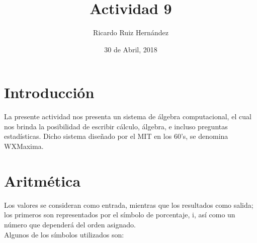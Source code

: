 \documentclass{article}
\title{Actividad 9}
\author{Ricardo Ruiz Hernández}
\date{30 de Abril, 2018}
\begin{document}
\maketitle 
\section*{Introducción}
La presente actividad nos presenta un sistema de álgebra computacional, el cual nos brinda la posibilidad de escribir cálculo, álgebra, e incluso preguntas estadísticas. Dicho sistema diseñado por el MIT en los 60's, se denomina WXMaxima. 

\section*{Aritmética}
Los valores se consideran como entrada, mientras que los resultados como salida; los primeros son representados por el símbolo de porcentaje, i, así como un número que dependerá del orden asignado.\\
Algunos de los símbolos utilizados son:
\end{document}
